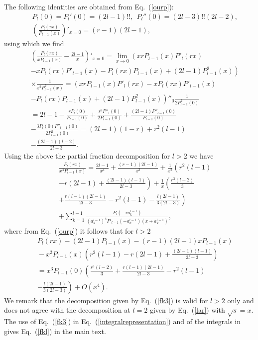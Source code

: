 \documentclass[aps,prx,twocolumn,amsmath,amssymb,amsfonts]{revtex4-2}
\begin{document}
{{\begin{appendices}
The following identities are obtained from Eq.~(\ref{ourp}):
\begin{eqnarray}&&
P_l(0)\!= \!P_l'(0)\!= \!(2l-1)!!,\ \ P_l''(0)=(2l-3)!!(2l\!-\!2),\nonumber \\&&
\left(\frac{P_{l}(r x)}{P_{l-1}(x)}\right)'_{x=0}\!=\!(r\!-\!1)(2l\!-\!1),
\end{eqnarray}
using which we find
\begin{eqnarray}&&
\left(\frac{P_l(r x)}{xP_{l-1}(x)}\!-\!\frac{2l-1}{x}\right)'_{x=0}=\lim_{x\to 0}\left(xrP_{l-1}(x)P'_l(r x)
\right.\nonumber\\&&\left.
-xP_l(r x)P'_{l-1}(x)-P_l(r x)P_{l-1}(x)+(2l-1)P^2_{l-1}(x)\right)
\nonumber\\&&\times\frac{1}{x^2P_{l-1}^2(x)}=\left(xrP_{l-1}(x)P'_l(r x)
-xP_l(r x)P'_{l-1}(x)
\right.\nonumber\\&&\left.
-P_l(r x)P_{l-1}(x)+(2l-1)P^2_{l-1}(x)\right)''_{0}\frac{1}{2P_{l-1}^2(0)}
\nonumber\\&&=2l-1-\frac{rP_l(0)}{P_{l-1}(0)}+\frac{r^2P''_l(0)}{2P_{l-1}(0)}
+\frac{(2l-1)P''_{l-1}(0)}{P_{l-1}(0)}
\nonumber\\&&
-\frac{3P_l(0)P''_{l-1}(0)}{2P_{l-1}^2(0)}=(2l-1)(1-r)+r^2(l-1)
\nonumber\\&&
-\frac{(2l-1)(l-2)}{2l-3}.
\end{eqnarray}
Using the above the partial fraction decomposition for $l>2$ we have
\begin{eqnarray}&&
\frac{P_{l}(r x)}{x^{4} P_{l-1}(x)}\!=\!\frac{2l\!-\!1}{x^4}\!+\!\frac{(r\!-\!1)(2l\!-\!1)}{x^3}\!+\!\frac{1}{x^2}\left(r^2(l\!-\!1)
\right.\nonumber\\&&\left. -r(2l\!-\!1)+\frac{(2l\!-\!1)(l\!-\!1)}{2l\!-\!3}\right)
\!+\!\frac{1}{x}\left(\frac{r^3(l\!-\!2)}{3}
\right.\nonumber\\&&\left. +\frac{r(l\!-\!1)(2l\!-\!1)}{2l\!-\!3}\!-\!r^2(l\!-\!1)
-\frac{l(2l\!-\!1)}{3(2l\!-\!3)}\right)
\nonumber\\&&
+\sum_{k=1}^{l-1}\frac{P_{l}(-r a_k^{l-1})}{\left(a_k^{l-1}\right)^4P'_{l-1}(-a_k^{l-1})\left(x\!+\!a_k^{l-1}\right)}, \label{fk3}
\end{eqnarray}
where from Eq.~(\ref{ourp}) it follows that for $l>2$
\begin{eqnarray}&&
P_l(r x)\!-\!(2l-1)P_{l-1}(x)\!-\!(r\!-\!1)(2l\!-\!1)xP_{l-1}(x)
\nonumber\\&&
\!-\!x^2 P_{l-1}(x)\left(r^2(l\!-\!1)-r(2l\!-\!1)+\frac{(2l\!-\!1)(l\!-\!1)}{2l\!-\!3}\right)
\nonumber\\&&
=x^3P_{l-1}(0)\left(\frac{r^3(l\!-\!2)}{3}\!+\!\frac{r(l\!-\!1)(2l\!-\!1)}{2l\!-\!3}\!-\!r^2(l\!-\!1)
\right.\nonumber\\&&\left.
-\frac{l(2l-1)}{3(2l-3)}\right)+O(x^4).
\end{eqnarray}
We remark that the decomposition given by Eq.~(\ref{fk3}) is valid for $l>2$ only and does not agree with the decomposition at $l=2$ given by Eq.~(\ref{lar}) with $\sqrt{s}=x$. The use of Eq.~(\ref{fk3}) in Eq.~(\ref{integralrepresentation}) and of the integrals in \cite{prud} gives Eq.~(\ref{fkl}) in the main text.


\end{appendices}}}
\end{document}
